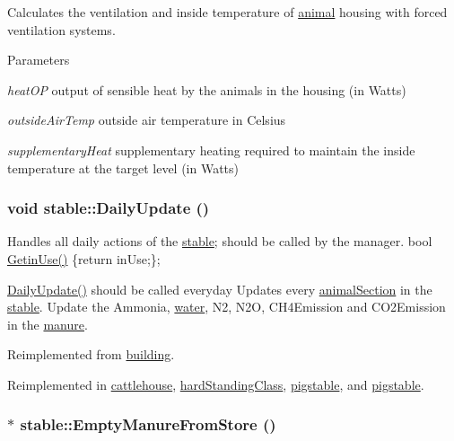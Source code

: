 Calculates the ventilation and inside temperature of \hyperlink{classanimal}{animal} housing with forced ventilation systems. 
\begin{DoxyParams}{Parameters}
\item[{\em heatOP}]output of sensible heat by the animals in the housing (in Watts) \item[{\em outsideAirTemp}]outside air temperature in Celsius \item[{\em supplementaryHeat}]supplementary heating required to maintain the inside temperature at the target level (in Watts) \end{DoxyParams}
\hypertarget{classstable_a8bdbc59976ddb6c324e7b629794ff388}{
\subsubsection[{DailyUpdate}]{\setlength{\rightskip}{0pt plus 5cm}void stable::DailyUpdate ()}}
\label{classstable_a8bdbc59976ddb6c324e7b629794ff388}


Handles all daily actions of the \hyperlink{classstable}{stable}; should be called by the manager. bool \hyperlink{classstable_a556b940db4c05999073d72bfee6adbbc}{GetinUse()} \{return inUse;\};

\hyperlink{classstable_a8bdbc59976ddb6c324e7b629794ff388}{DailyUpdate()} should be called everyday Updates every \hyperlink{classanimal_section}{animalSection} in the \hyperlink{classstable}{stable}. Update the Ammonia, \hyperlink{classwater}{water}, N2, N2O, CH4Emission and CO2Emission in the \hyperlink{classmanure}{manure}. 

Reimplemented from \hyperlink{classbuilding_a584ba300427d2a648f478b68065b7a18}{building}.

Reimplemented in \hyperlink{classcattlehouse_a75cd328a6b1b07b2eb49be0048ac889d}{cattlehouse}, \hyperlink{classhard_standing_class_ac182354be245579d4b8ec936add0c0be}{hardStandingClass}, \hyperlink{classpigstable_a971c427391124e56a4374ace16c461df}{pigstable}, and \hyperlink{classpigstable_a0339646d96e17f62b6e745be279ec633}{pigstable}.\hypertarget{classstable_a29cdecb2508e0504a5382d6d13b123a9}{
\subsubsection[{EmptyManureFromStore}]{ $\ast$ stable::EmptyManureFromStore ()}}
\label{classstable_a29cdecb2508e0504a5382d6d13b123a9}


